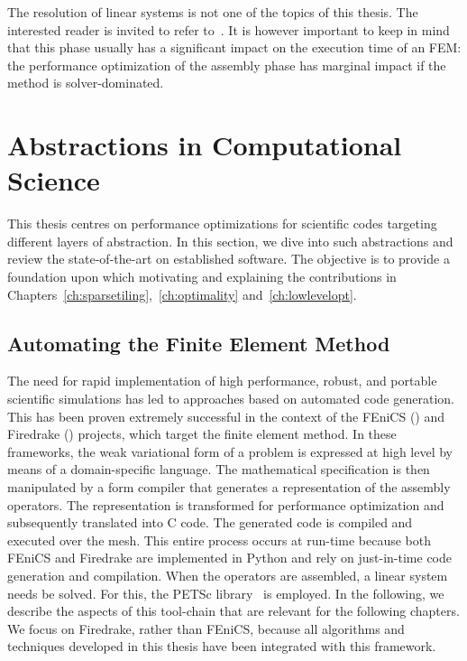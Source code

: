 The resolution of linear systems is not one of the topics of this thesis. The interested reader is invited to refer to~\cite{good-linear-system-source}. It is however important to keep in mind that this phase usually has a significant impact on the execution time of an FEM: the performance optimization of the assembly phase has marginal impact if the method is solver-dominated. 




\section{Abstractions in Computational Science}
\label{sec:bkg:abstractions}

This thesis centres on performance optimizations for scientific codes targeting different layers of abstraction. In this section, we dive into such abstractions and review the state-of-the-art on established software. The objective is to provide a foundation upon which motivating and explaining the contributions in Chapters~\ref{ch:sparsetiling},~\ref{ch:optimality} and~\ref{ch:lowlevelopt}.



\subsection{Automating the Finite Element Method}
\label{sec:bkg:fenics-and-firedrake}

The need for rapid implementation of high performance, robust, and portable scientific simulations has led to approaches based on automated code generation. This has been proven extremely successful in the context of the FEniCS (\cite{Fenics}) and Firedrake (\cite{firedrake-paper}) projects, which target the finite element method. In these frameworks, the weak variational form of a problem is expressed at high level by means of a domain-specific language. The mathematical specification is then manipulated by a form compiler that generates a representation of the assembly operators. The representation is transformed for performance optimization and subsequently translated into C code. The generated code is compiled and executed over the mesh. This entire process occurs at run-time because both FEniCS and Firedrake are implemented in Python and rely on just-in-time code generation and compilation. When the operators are assembled, a linear system needs be solved. For this, the PETSc library~\cite{petsc-cite} is employed. In the following, we describe the aspects of this tool-chain that are relevant for the following chapters. We focus on Firedrake, rather than FEniCS, because all algorithms and techniques developed in this thesis have been integrated with this framework.

